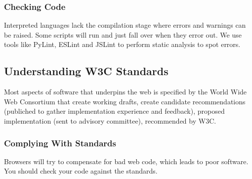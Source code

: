 \subsubsection{Checking Code}\label{ssub:checking_code}

Interpreted languages lack the compilation stage where errors and warnings can be raised.
Some scripts will run and just fall over when they error out.
We use tools like PyLint, ESLint and JSLint to perform static analysis to spot errors.

\subsection{Understanding W3C Standards}\label{sub:understanding_w3c_standards}

Most aspects of software that underpins the web is specified by the World Wide Web Consortium that create working drafts, create candidate recommendations (publiched to gather implementation experience and feedback), proposed implementation (sent to advisory committee), recommended by W3C.

\subsubsection{Complying With Standards}\label{ssub:complying_with_standards}

Browsers will try to compensate for bad web code, which leads to poor software.
You should check your code against the standards.
